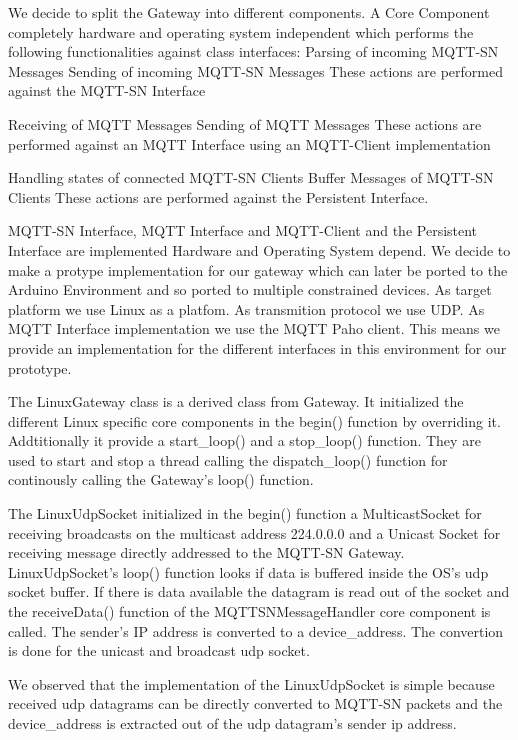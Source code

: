 We decide to split the Gateway into different components.
A Core Component completely hardware and operating system independent which performs the following functionalities against class interfaces:
Parsing of incoming MQTT-SN Messages
Sending of incoming MQTT-SN Messages
These actions are performed against the MQTT-SN Interface

Receiving of MQTT Messages
Sending of MQTT Messages
These actions are performed against an MQTT Interface using an MQTT-Client implementation

Handling states of connected MQTT-SN Clients
Buffer Messages of MQTT-SN Clients
These actions are performed against the Persistent Interface.

MQTT-SN Interface, MQTT Interface and MQTT-Client and the Persistent Interface are implemented Hardware and Operating System depend.
We decide to make a protype implementation for our gateway which can later be ported to the Arduino Environment and so ported to multiple constrained devices.
As target platform we use Linux as a platfom. As transmition protocol we use UDP. As MQTT Interface implementation we use the MQTT Paho client.
This means we provide an implementation for the different interfaces in this environment for our prototype.

The LinuxGateway class is a derived class from Gateway.
It initialized the different Linux specific core components in the begin() function by overriding it.
Addtitionally it provide a start\_loop() and a stop\_loop() function.
They are used to start and stop a thread calling the dispatch\_loop() function for continously calling the Gateway's loop() function.

The LinuxUdpSocket initialized in the begin() function a MulticastSocket for receiving broadcasts on the multicast address 224.0.0.0 and a Unicast Socket for receiving message directly addressed to the MQTT-SN Gateway.
LinuxUdpSocket's loop() function looks if data is buffered inside the OS's udp socket buffer.
If there is data available the datagram is read out of the socket and the receiveData() function of the MQTTSNMessageHandler core component is called.
The sender's IP address is converted to a device\_address. The convertion is done for the unicast and broadcast udp socket.

We observed that the implementation of the LinuxUdpSocket is simple because received udp datagrams can be directly converted to MQTT-SN packets and the device\_address is extracted out of the udp datagram's sender ip address.

